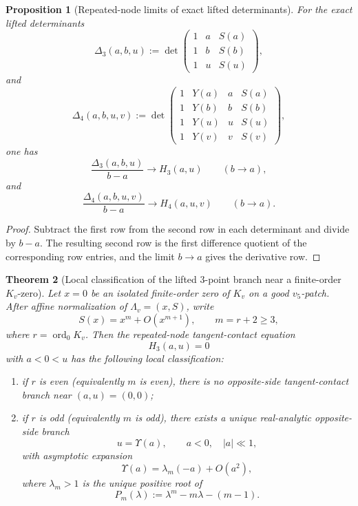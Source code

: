 \documentclass[11pt,a4paper]{amsart}
\theoremstyle{plain}
\newtheorem{theorem}{Theorem}[section]
\newtheorem{proposition}[theorem]{Proposition}
\theoremstyle{definition}
\begin{document}
\begin{proposition}[Repeated-node limits of exact lifted determinants]
\label{prop:repeated-node-limits-of-exact-lifted-determinants}
For the exact lifted determinants
\[
\Delta_3(a,b,u):=
\det\!\begin{pmatrix}
1&a&S(a)\\
1&b&S(b)\\
1&u&S(u)
\end{pmatrix},
\]
and
\[
\Delta_4(a,b,u,v):=
\det\!\begin{pmatrix}
1&Y(a)&a&S(a)\\
1&Y(b)&b&S(b)\\
1&Y(u)&u&S(u)\\
1&Y(v)&v&S(v)
\end{pmatrix},
\]
one has
\[
\frac{\Delta_3(a,b,u)}{b-a}\longrightarrow H_3(a,u)
\qquad (b\to a),
\]
and
\[
\frac{\Delta_4(a,b,u,v)}{b-a}\longrightarrow H_4(a,u,v)
\qquad (b\to a).
\]
\end{proposition}

\begin{proof}
Subtract the first row from the second row in each determinant and divide by
$b-a$. The resulting second row is the first difference quotient of the
corresponding row entries, and the limit $b\to a$ gives the derivative row.
\end{proof}

\begin{theorem}[Local classification of the lifted $3$-point branch near a finite-order $K_v$-zero]
\label{thm:local-classification-lifted-three-point-branch-near-Kv-zero}
Let $x=0$ be an isolated finite-order zero of $K_v$ on a good $v_5$-patch.
After affine normalization of $\Lambda_v=(x,S)$, write
\[
S(x)=x^m+O(x^{m+1}),
\qquad
m=r+2\ge 3,
\]
where $r=\operatorname{ord}_0 K_v$. Then the repeated-node tangent-contact equation
\[
H_3(a,u)=0
\]
with $a<0<u$ has the following local classification:
\begin{enumerate}
\item if $r$ is even (equivalently $m$ is even), there is no
opposite-side tangent-contact branch near $(a,u)=(0,0)$;
\item if $r$ is odd (equivalently $m$ is odd), there exists a unique
real-analytic opposite-side branch
\[
u=\Upsilon(a),
\qquad
a<0,\quad |a|\ll 1,
\]
with asymptotic expansion
\[
\Upsilon(a)=\lambda_m(-a)+O(a^2),
\]
where $\lambda_m>1$ is the unique positive root of
\[
P_m(\lambda):=\lambda^m-m\lambda-(m-1).
\]
\end{enumerate}
\end{theorem}
\end{document}
